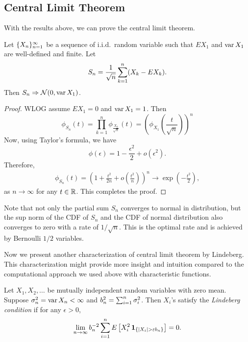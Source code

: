 \documentclass[a4paper]{article}
\newcommand{\convd}{\Rightarrow}
\begin{document}
\subsection{Central Limit Theorem}

With the results above, we can prove the central limit theorem.
\begin{thm}
  Let $\{ X_n \}_{n=1}^\infty$  be a sequence of i.i.d.\ random variable
  such that $E X_1$ and $\operatorname{var} X_1$ are well-defined and finite.
  Let
  \[
    S_n = \frac{1}{\sqrt{n}} \sum_{k=1}^n (X_k - E X_k).
  \]
  Then $S_n \convd \ncal (0, \var X_1)$.
\end{thm}

\begin{proof}
  WLOG assume $E X_1 = 0$ and $\operatorname{var} X_1 = 1$. Then
  \[
    \phi_{S_n} (t)
    = \prod_{k=1}^n \phi_{\frac{X_k}{\sqrt{n}}} (t)
    = \left( \phi_{X_1} \left( \frac{t}{\sqrt{n}} \right) \right)^n
  \]
  Now, using Taylor's formula, we have
  \[
    \phi (\epsilon) = 1 - \frac{\epsilon^2}{2} + o(\epsilon^2).
  \]
  Therefore,
  \begin{align*}
    \phi_{S_n} (t)
    = \left( 1 + \frac{t^2}{2 n} + o \left( \frac{t^2}{n} \right) \right)^n
    \to \exp \left( - \frac{t^2}{2} \right),
  \end{align*}
  as $n \to \infty$ for any $t \in \mathbb{R}$. This completes the proof.

\end{proof}

\begin{remark}
  Note that not only the partial sum $S_n$ converges to normal
  in distribution, but the sup norm of the CDF of $S_n$ and the
  CDF of normal distribution also converges to zero with a rate
  of $1 / \sqrt{n}$. This is the optimal rate and is achieved by
  Bernoulli $1/2$ variables.
\end{remark}

Now we present another characterization of central limit theorem
by Lindeberg. This characterization might provide more insight
and intuition compared to the computational approach we used above
with characteristic functions.

\begin{defi}
  Let $X_1, X_2, \dots$ be mutually independent random variables
  with zero mean. Suppose $\sigma_n^2 = \operatorname{var} X_n < \infty$ and
  $b_n^2 = \sum_{i=1}^n
    \sigma_i^2$. Then $X_i$'s satisfy the \emph{Lindeberg condition}
  if for any $\epsilon > 0$,
  \[
    \lim_{n \to \infty} b_n^{-2}
    \sum_{i=1}^n E \left[ X_i^2 \operatorname{\mathbf{1}}_{\{\left\lvert X_i\right\rvert > \varepsilon b_n\}} \right] = 0.
  \]
\end{defi}
\end{document}
